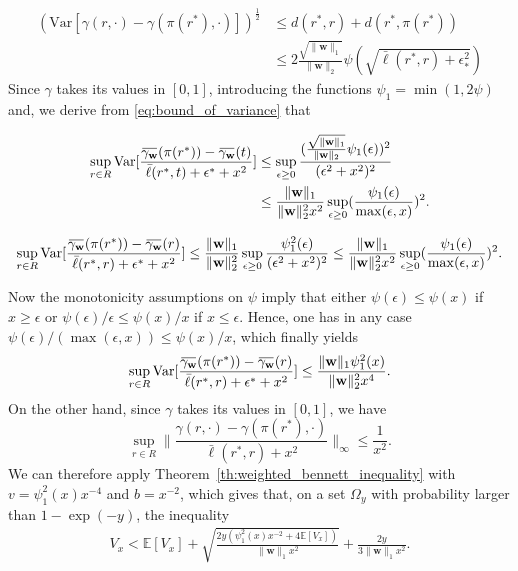 \documentclass[letterpaper]{article} %
\def\DoubleColumn{}
\def\DoubleColumnEnd{}
\def\SingleColumn{}
\def\SingleColumnEnd{}
\newcommand{\E}{\mathbb{E}}
\newcommand{\Var}{\text{Var}}
\newcommand{\overbar}[1]{\mkern 1.5mu\overline{\mkern-1.5mu#1\mkern-1.5mu}\mkern 1.5mu}
\newcommand*\cen[1]{\overbar{#1}}
\newcommand{\weight}{\mathbf{w}}
\newcommand{\relossf}{\bar{\ell}}
\newcommand{\cenprocess}[1]{\cen{\gamma_{#1}}}
\newcommand{\normo}[1]{\|#1\|_1}
\begin{document}
    \begin{equation}
        \begin{aligned}
            \label{eq:bound_of_variance}
            (\Var[\gamma(r,\cdot)-\gamma(\pi(r^*),\cdot)])^{\frac{1}{2}}&\le d(r^*,r)+d(r^*, \pi(r^*))\\
            &\le 2\frac{\sqrt{\normo{\weight{}}}}{\|\weight{}\|_2}\psi(\sqrt{\relossf(r^*,r)+\epsilon_*^2})
        \end{aligned}
    \end{equation}
    Since $\gamma$ takes its values in $[0,1]$, introducing the functions $\psi_1=\min(1,2\psi)$ and, we derive from \eqref{eq:bound_of_variance} that
    \DoubleColumn
    \begin{align*}
        \sup_{r\in R}\Var[\frac{\cenprocess{\weight}(\pi(r^*))-\cenprocess{\weight}(t)}{\relossf(r^*,t)+\epsilon^*+x^2}]&\le \sup_{\epsilon\ge 0}\frac{(\frac{\sqrt{\normo{\weight{}}}}{\|\weight{}\|_2}\psi_1(\epsilon))^2}{(\epsilon^2+x^2)^2}\\
        &\le \frac{\normo{\weight{}}}{\|\weight{}\|_2^2x^2}\sup_{\epsilon\ge 0}(\frac{\psi_1(\epsilon)}{\max(\epsilon,x)})^2.
    \end{align*}
    \DoubleColumnEnd
    \SingleColumn
    \[\sup_{r\in R}\Var[\frac{\cenprocess{\weight}(\pi(r^*))-\cenprocess{\weight}(r)}{\relossf(r^*,r)+\epsilon^*+x^2}]\le \frac{\normo{\weight{}}}{\|\weight{}\|_2^2}\sup_{\epsilon\ge 0}\frac{\psi_1^2(\epsilon)}{(\epsilon^2+x^2)^2}\le \frac{\normo{\weight{}}}{\|\weight{}\|_2^2x^2}\sup_{\epsilon\ge 0}(\frac{\psi_1(\epsilon)}{\max(\epsilon,x)})^2.\]
    \SingleColumnEnd
    Now the monotonicity assumptions on $\psi$ imply that either $\psi(\epsilon)\le \psi(x)$ if $x\ge \epsilon$ or $\psi(\epsilon)/\epsilon\le \psi(x)/x$ if $x\le \epsilon$. Hence, one has in any case $\psi(\epsilon)/(\max(\epsilon,x))\le \psi(x)/x$, which finally yields
    \[\sup_{r\in R}\Var[\frac{\cenprocess{\weight}(\pi(r^*))-\cenprocess{\weight}(r)}{\relossf(r^*,r)+\epsilon^*+x^2}]\le\frac{\normo{\weight{}}\psi_1^2(x)}{\|\weight{}\|_2^2x^4}.\]
    On the other hand, since $\gamma$ takes its values in $[0,1]$, we have
    \[\sup_{r\in R}\|\frac{\gamma(r,\cdot)-\gamma(\pi(r^*),\cdot)}{\relossf(r^*,r)+x^2}\|_\infty\le \frac{1}{x^2}.\]
    We can therefore apply Theorem~\ref{th:weighted_bennett_inequality} with $v=\psi_1^2(x)x^{-4}$ and $b=x^{-2}$, which gives that, on a set $\Omega_y$ with probability larger than $1-\exp(-y)$, the inequality
    \begin{equation}
        \begin{aligned}
            \label{eq:v_x_bennett_inequality}
            V_x < \E[V_x]+\sqrt{\frac{2y(\psi_1^2(x)x^{-2}+4\E[V_x])}{\normo{\weight{}}x^2}}+\frac{2y}{3\normo{\weight{}}x^2}.
        \end{aligned}
    \end{equation}
\end{document}
